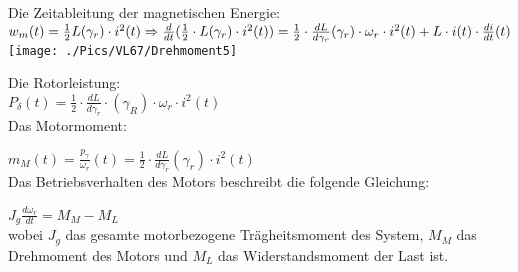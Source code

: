 \begin{minipage}{0.5 \linewidth}
Die Zeitableitung der magnetischen Energie: \\

$w_m(t) = \frac{1}{2} L(\gamma_r) \cdot i^2(t) \Rightarrow \frac{d}{dt}(\frac{1}{2}\cdot L(\gamma_r)\cdot i^2(t)) = \\
\frac{1}{2} \cdot \frac{dL}{d\gamma_r}(\gamma_r) \cdot \omega_r \cdot i^2(t) + L \cdot i(t) \cdot \frac{di}{dt}(t)$ \\

\texttt{[image: ./Pics/VL67/Drehmoment5]}
\end{minipage}
\begin{minipage}{0.5 \linewidth}
Die Rotorleistung: \\

$P_\delta (t) = \frac{1}{2} \cdot \frac{dL}{d\gamma_r}\cdot(\gamma_R) \cdot \omega_r \cdot i^2(t)$ \\

Das Motormoment: 

$m_M(t) = \frac{p_\gamma}{\omega_r}(t) = \frac{1}{2} \cdot \frac{dL}{d\gamma_r}(\gamma_r) \cdot i^2(t)$\\

Das Betriebsverhalten des Motors beschreibt die folgende Gleichung: 

$J_g \frac{d\omega_r}{dt} = M_M - M_L $\\

wobei $J_g$ das gesamte motorbezogene Trägheitsmoment des System, $M_M$ das Drehmoment des Motors und $M_L$ das Widerstandsmoment der Last ist.\\
\end{minipage}

